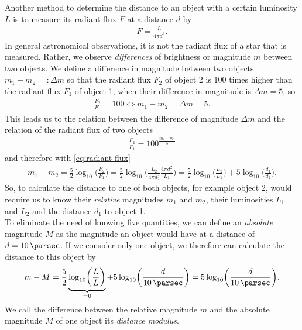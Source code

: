 Another method to determine the distance to an object with a certain luminosity $L$ is to measure its radiant flux $F$ at a distance $d$ by
\begin{align}
    F = \frac{L}{4\pi d^2}. \label{eq:radiant-flux} 
\end{align}
In general astronomical observations, it is not the radiant flux of a star that is measured. Rather, we observe \textit{differences} of brightness or magnitude $m$ between two objects. We define a difference in magnitude between two objects $m_{1} - m_{2} =: \Delta m$ so that the radiant flux $F_{2}$ of object 2 is 100 times higher than the radiant flux $F_{1}$ of object 1, when their difference in magnitude is $\Delta m = 5$, so 
\begin{align}
    \frac{F_{2}}{F_{1}} = 100 \Leftrightarrow m_{1} - m_{2} = \Delta m = 5.
\end{align}
This leads us to the relation between the difference of magnitude $\Delta m$ and the relation of the radiant flux of two objects
\begin{align}
    \frac{F_{2}}{F_{1}} = 100^{\frac{m_{1} - m_{2}}{5}} 
\end{align}
and therefore with \eqref{eq:radiant-flux}
\begin{align}
    m_{1} - m_{2} = \frac{5}{2} \log_{10} \biggl( \frac{F_{2}}{F_{1}} \biggr) = \frac{5}{2} \log_{10} \biggl( \frac{L_{2}}{4\pi d_{2}^2} \frac{4\pi d_{1}^2}{L_{1}} \biggr) = \frac{5}{2} \log_{10} \biggl( \frac{L_{2}}{L_{1}} \biggr) + 5 \log_{10} \biggl( \frac{d_{1}}{d_{2}} \biggr). \label{eq:rel-magnitude-distance-relation} 
\end{align}
So, to calculate the distance to one of both objects, for example object 2, would require us to know their \textit{relative} magnitudes $m_{1}$ and $m_{2}$, their luminosities $L_{1}$ and $L_{2}$ and the distance $d_{1}$ to object 1. \\
To eliminate the need of knowing five quantities, we can define an \textit{absolute} magnitude $M$ as the magnitude an object would have at a distance of $d = \SI{10}{\parsec}$. If we consider only one object, we therefore can calculate the distance to this object by
\begin{align}
    m - M = \frac{5}{2} \underbrace{\log_{10} \biggl( \frac{L}{L} \biggr)}_{ = 0} + 5 \log_{10} \biggl( \frac{d}{\SI{10}{\parsec}} \biggr) = 5 \log_{10} \biggl(\frac{d}{\SI{10}{\parsec}}\biggr). \label{eq:distance-modulus} 
\end{align}
We call the difference between the relative magnitude $m$ and the absolute magnitude $M$ of one object its \textit{distance modulus}. \\
